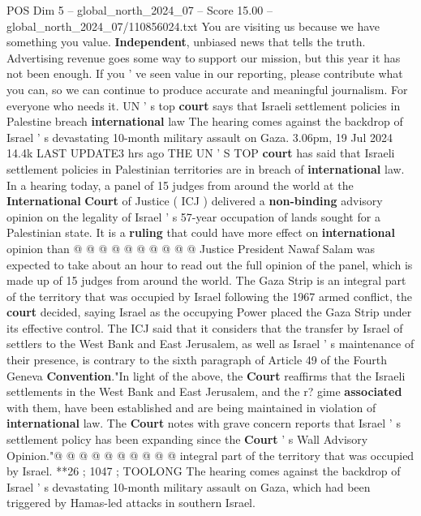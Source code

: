 \begin{textsample}{POS Dim 5 – global\_north\_2024\_07 – Score 15.00 – global\_north\_2024\_07/110856024.txt}  \label{ex:f5_pos_305}
You are visiting us because we have something you value. \textbf{Independent}, unbiased news that tells the truth.
Advertising revenue goes some way to support our mission, but this year it has not been enough.
If you ' ve seen value in our reporting, please contribute what you can, so we can continue to produce accurate and meaningful journalism.
For everyone who needs it.
UN ' s top \textbf{court} says that Israeli settlement policies in Palestine breach \textbf{international} law The hearing comes against the backdrop of Israel ' s devastating 10-month military assault on Gaza. 3.06pm, 19 Jul 2024 14.4k LAST UPDATE3 hrs ago THE UN ' S TOP \textbf{court} has said that Israeli settlement policies in Palestinian territories are in breach of \textbf{international} law.
In a hearing today, a panel of 15 judges from around the world at the \textbf{International} \textbf{Court} of Justice ( ICJ ) delivered a \textbf{non-binding} advisory opinion on the legality of Israel ' s 57-year occupation of lands sought for a Palestinian state.
It is a \textbf{ruling} that could have more effect on \textbf{international} opinion than @ @ @ @ @ @ @ @ @ @ Justice President Nawaf Salam was expected to take about an hour to read out the full opinion of the panel, which is made up of 15 judges from around the world.
The Gaza Strip is an integral part of the territory that was occupied by Israel following the 1967 armed conflict, the \textbf{court} decided, saying Israel as the occupying Power placed the Gaza Strip under its effective control.
The ICJ said that it considers that the transfer by Israel of settlers to the West Bank and East Jerusalem, as well as Israel ' s maintenance of their presence, is contrary to the sixth paragraph of Article 49 of the Fourth Geneva \textbf{Convention}."In light of the above, the \textbf{Court} reaffirms that the Israeli settlements in the West Bank and East Jerusalem, and the r? gime \textbf{associated} with them, have been established and are being maintained in violation of \textbf{international} law.
The \textbf{Court} notes with grave concern reports that Israel ' s settlement policy has been expanding since the \textbf{Court} ' s Wall Advisory Opinion."@ @ @ @ @ @ @ @ @ @ integral part of the territory that was occupied by Israel. **26 ; 1047 ; TOOLONG The hearing comes against the backdrop of Israel ' s devastating 10-month military assault on Gaza, which had been triggered by Hamas-led attacks in southern Israel.

\end{textsample}
